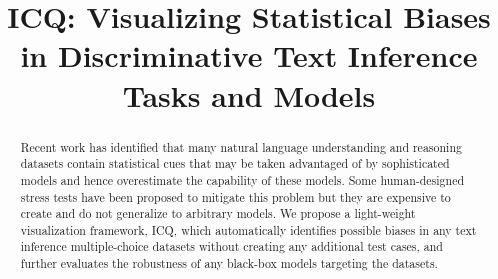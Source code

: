 \documentclass[conference]{IEEEtran}
\begin{document}
\title{ICQ: Visualizing Statistical Biases in Discriminative Text Inference Tasks and Models}

\author{
\and
{}
}


\maketitle
\begin{abstract}
Recent work has identified that many natural language understanding and 
reasoning datasets contain statistical cues that
may be taken advantaged of by sophisticated models and hence overestimate the 
capability of these models. 
Some human-designed stress tests have been proposed to mitigate this problem
but they are expensive to create and do not generalize to arbitrary models. 
We propose a light-weight visualization framework, ICQ, 
which automatically identifies possible biases
in any text inference multiple-choice datasets without creating any additional
test cases, and further evaluates
the robustness of any black-box models targeting the datasets. 
\end{abstract}












\end{document}
